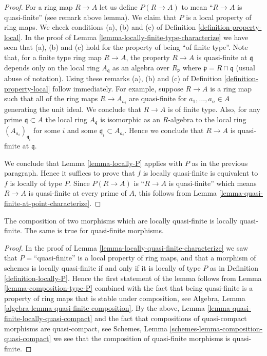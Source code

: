 \begin{proof}
For a ring map $R \to A$ let us define
$P(R \to A)$ to mean ``$R \to A$ is quasi-finite''
(see remark above lemma).
We claim that $P$ is a local property of ring maps.
We check conditions (a), (b) and (c) of Definition
\ref{definition-property-local}. In the proof of
Lemma \ref{lemma-locally-finite-type-characterize}
we have seen that (a), (b) and (c) hold for the property
of being ``of finite type''. Note that, for a finite type ring map
$R \to A$, the property $R \to A$ is quasi-finite at $\mathfrak q$
depends only on the local ring $A_{\mathfrak q}$ as an
algebra over $R_{\mathfrak p}$ where $\mathfrak p = R \cap \mathfrak q$
(usual abuse of notation). Using these remarks (a), (b) and (c) of
Definition \ref{definition-property-local} follow immediately.
For example, suppose $R \to A$ is a ring map
such that all of the ring maps $R \to A_{a_i}$ are quasi-finite
for $a_1, \ldots, a_n \in A$ generating the unit ideal.
We conclude that $R \to A$ is of finite type. Also, for any
prime $\mathfrak q \subset A$ the local ring $A_{\mathfrak q}$
is isomorphic as an $R$-algebra to the local ring
$(A_{a_i})_{\mathfrak q_i}$ for some $i$ and some
$\mathfrak q_i \subset A_{a_i}$. Hence we conclude that
$R \to A$ is quasi-finite at $\mathfrak q$.

\medskip\noindent
We conclude that Lemma \ref{lemma-locally-P} applies with $P$
as in the previous paragraph.
Hence it suffices to prove that $f$ is locally quasi-finite is
equivalent to $f$ is locally of type $P$. Since $P(R \to A)$
is ``$R \to A$ is quasi-finite'' which means $R \to A$ is
quasi-finite at every prime of $A$, this follows from
Lemma \ref{lemma-quasi-finite-at-point-characterize}.
\end{proof}

\begin{lemma}
\label{lemma-composition-quasi-finite}
The composition of two morphisms which are locally quasi-finite is
locally quasi-finite. The same is true for quasi-finite morphisms.
\end{lemma}

\begin{proof}
In the proof of Lemma \ref{lemma-locally-quasi-finite-characterize}
we saw that $P = $``quasi-finite'' is a local property of ring maps,
and that a morphism of schemes is locally quasi-finite if and only if
it is locally of type $P$ as in Definition \ref{definition-locally-P}.
Hence the first statement of the lemma follows from
Lemma \ref{lemma-composition-type-P} combined
with the fact that being quasi-finite is a property of ring maps that is
stable under composition, see
Algebra, Lemma \ref{algebra-lemma-quasi-finite-composition}.
By the above, Lemma \ref{lemma-quasi-finite-locally-quasi-compact}
and the fact that compositions of
quasi-compact morphisms are quasi-compact, see
Schemes, Lemma \ref{schemes-lemma-composition-quasi-compact}
we see that the composition of quasi-finite morphisms is
quasi-finite.
\end{proof}

